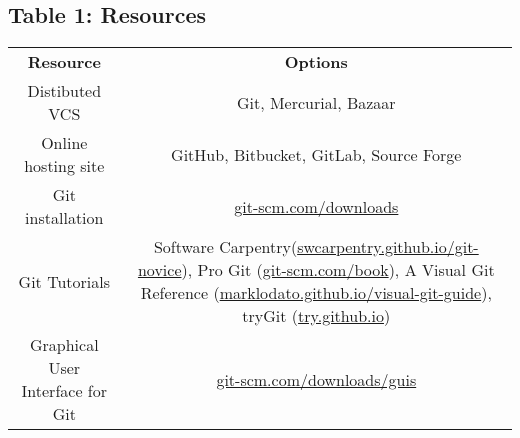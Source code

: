 \subsection{Table 1: Resources}

\begin{tabular}{ c c }
    \textbf{Resource} & \textbf{Options} \\ 
    Distibuted VCS & Git, Mercurial, Bazaar \\ 
    Online hosting site & GitHub, Bitbucket, GitLab, Source Forge \\ 
    Git installation & \href{git-scm.com/downloads}{git-scm.com/downloads} \\ 
    Git Tutorials & Software Carpentry(\href{swcarpentry.github.io/git-novice}{swcarpentry.github.io/git-novice}), Pro Git (\href{git-scm.com/book}{git-scm.com/book}), A Visual Git Reference (\href{marklodato.github.io/visual-git-guide}{marklodato.github.io/visual-git-guide}), tryGit (\href{try.github.io}{try.github.io}) \\ 
    Graphical User Interface for Git & \href{git-scm.com/downloads/guis}{git-scm.com/downloads/guis} \\ 
\end{tabular}